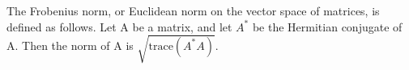 The Frobenius norm, or Euclidean norm on the vector space of matrices,
is defined as follows. Let A be a matrix, and let $A^{*}$ 
be the Hermitian conjugate of A. Then the norm of A is 
$ \sqrt { \text{trace} ( A ^{*} A ) } . $